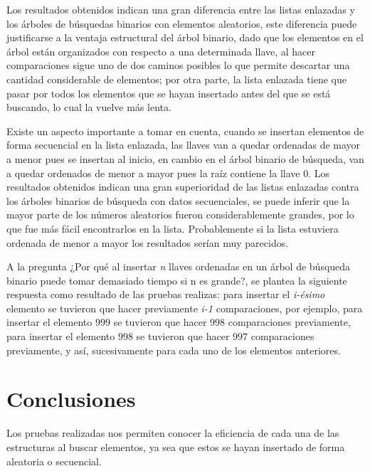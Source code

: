 \documentclass[twocolumn,english,spanish,journal]{IEEEtran}
\begin{document}
Los resultados obtenidos indican una gran diferencia entre las listas enlazadas y los árboles de búsquedas binarios con elementos aleatorios, este diferencia puede justificarse a la ventaja estructural del árbol binario, dado que los elementos en el árbol están organizados con respecto a una determinada llave, al hacer comparaciones sigue uno de dos caminos posibles lo que permite descartar una cantidad considerable de elementos; por otra parte, la lista enlazada tiene que pasar por todos los elementos que se hayan insertado antes del que se está buscando, lo cual la vuelve más lenta.\newline

Existe un aspecto importante a tomar en cuenta, cuando se insertan elementos de forma secuencial en la lista enlazada, las llaves van a quedar ordenadas de mayor a menor pues se insertan al inicio, en cambio en el árbol binario de búsqueda, van a quedar ordenados de menor a mayor pues la raíz contiene la llave 0. Los resultados obtenidos indican una gran superioridad de las listas enlazadas contra los árboles binarios de búsqueda con datos secuenciales, se puede inferir que la mayor parte de los números aleatorios fueron considerablemente grandes, por lo que fue más fácil encontrarlos en la lista. Probablemente si la lista estuviera ordenada de menor a mayor los resultados serían muy parecidos.\newline

A la pregunta ¿Por qué al insertar \textit{n} llaves ordenadas en un árbol de búsqueda binario puede tomar demasiado tiempo si n es
grande?, se plantea la siguiente respuesta como resultado de las pruebas realizas: para insertar el \textit{i-ésimo} elemento se tuvieron que hacer previamente \textit{i-1} comparaciones, por ejemplo, para insertar el elemento $999$ se tuvieron que hacer $998$ comparaciones previamente, para insertar el elemento $998$ se tuvieron que hacer $997$ comparaciones previamente, y así, sucesivamente para cada uno de los elementos anteriores.\newline

\section{Conclusiones}

Los pruebas realizadas nos permiten conocer la eficiencia de cada una de las estructuras
al buscar elementos, ya sea que estos se hayan insertado de forma aleatoria o secuencial.\newline
\end{document}
